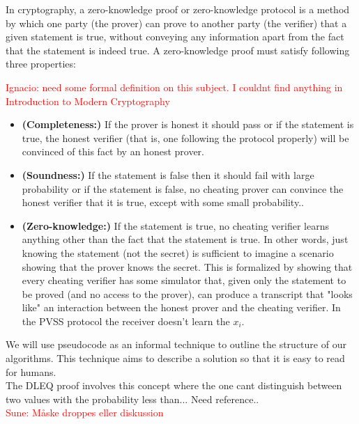  In cryptography, a zero-knowledge proof or zero-knowledge protocol is a method by which one party (the prover) can prove to another party (the verifier) that a given statement is true, without conveying any information apart from the fact that the statement is indeed true. A zero-knowledge proof must satisfy following three properties:
\begin{defi}
\textcolor{red}{Ignacio: need some formal definition on this subject. I couldnt find anything in Introduction to Modern Cryptography }
\end{defi}
\begin{itemize}
\item  \textnormal{\textbf{(Completeness:)}} If the prover is honest it should pass or if the statement is true, the honest verifier (that is, one following the protocol properly) will be convinced of this fact by an honest prover.
\item    \textnormal{\textbf{(Soundness:)}} If the statement is false then it should fail with large probability or if the statement is false, no cheating prover can convince the honest verifier that it is true, except with some small probability..
\item   \textnormal{\textbf{(Zero-knowledge:)}} If the statement is true, no cheating verifier learns anything other than the fact that the statement is true. In other words, just knowing the statement (not the secret) is sufficient to imagine a scenario showing that the prover knows the secret. This is formalized by showing that every cheating verifier has some simulator that, given only the statement to be proved (and no access to the prover), can produce a transcript that "looks like" an interaction between the honest prover and the cheating verifier. In the PVSS protocol the receiver doesn't learn the \begin{math}x_i \end{math}.
\end{itemize}



 We will use pseudocode as an informal technique to outline the structure of our algorithms. This technique aims to describe a solution so that it is easy to read for humans.\\

The DLEQ proof involves this concept where the one cant distinguish between two values with the probability less than... Need reference..\\
\textcolor{red}{Sune: Måske droppes eller diskussion}



